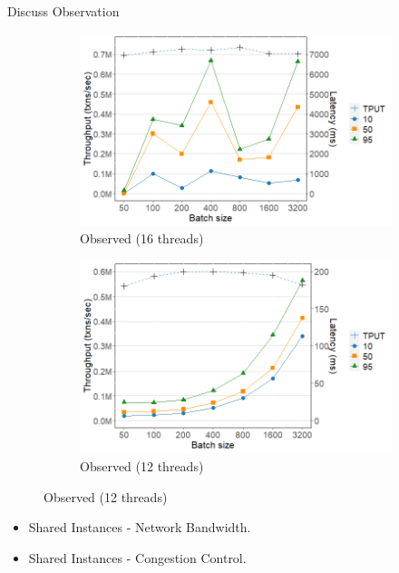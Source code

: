 \documentclass[xcolor=dvipsnames]{beamer}
\begin{document}
    \begin{frame}{Discuss Observation}
    
        \begin{figure}
            \begin{subfigure}[h]{0.4\linewidth}
                \includegraphics[scale=0.28]{fig16_16t.png}
                \caption{Observed (16 threads)}
            \end{subfigure}
            \hfill
            \begin{subfigure}[h]{0.5\linewidth}
                \includegraphics[scale=0.28]{fig16_12t.png}
                \caption{Observed (12 threads)}
            \end{subfigure}
        \end{figure}

        \begin{itemize}
            \item Shared Instances - Network Bandwidth.
            \item Shared Instances - Congestion Control.
        \end{itemize}

    \end{frame}
\end{document}
